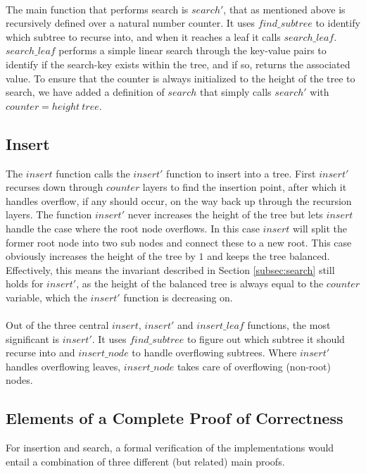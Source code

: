 \paragraph{}
The main function that performs search is $search'$, that as mentioned above is recursively defined over a natural number counter. It uses $find\_subtree$ to identify which subtree to recurse into, and when it reaches a leaf it calls $search\_leaf$. $search\_leaf$ performs a simple linear search through the key-value pairs to identify if the search-key exists within the tree, and if so, returns the associated value. To ensure that the counter is always initialized to the height of the tree to search, we have added a definition of $search$ that simply calls $search'$ with $counter = height~tree$.

\subsection{Insert}
The $insert$ function calls the $insert'$ function to insert into a tree. First $insert'$ recurses down through $counter$ layers to find the insertion point, after which it handles overflow, if any should occur, on the way back up through the recursion layers. The function $insert'$ never increases the height of the tree but lets $insert$ handle the case where the root node overflows. In this case $insert$ will split the former root node into two sub nodes and connect these to a new root. This case obviously increases the height of the tree by $1$ and keeps the tree balanced. Effectively, this means the invariant described in Section \ref{subsec:search} still holds for $insert'$, as the height of the balanced tree is always equal to the $counter$ variable, which the $insert'$ function is decreasing on.

\paragraph{}
Out of the three central $insert$, $insert'$ and $insert\_leaf$ functions, the most significant is $insert'$. It uses $find\_subtree$ to figure out which subtree it should recurse into and $insert\_node$ to handle overflowing subtrees. Where $insert'$ handles overflowing leaves, $insert\_node$ takes care of overflowing (non-root) nodes.

\subsection{Elements of a Complete Proof of Correctness}
For insertion and search, a formal verification of the implementations would entail a combination of three different (but related) main proofs.

